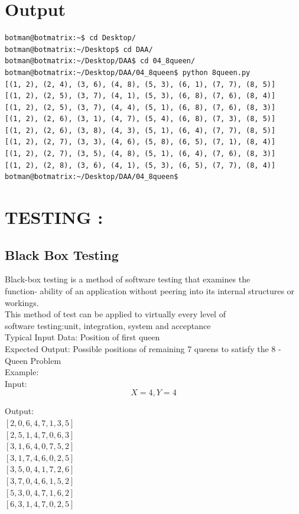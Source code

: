 \documentclass[10pt,a4paper]{article}
\begin{document}
\section{Output}
\begin{lstlisting}
botman@botmatrix:~$ cd Desktop/
botman@botmatrix:~/Desktop$ cd DAA/
botman@botmatrix:~/Desktop/DAA$ cd 04_8queen/
botman@botmatrix:~/Desktop/DAA/04_8queen$ python 8queen.py 
[(1, 2), (2, 4), (3, 6), (4, 8), (5, 3), (6, 1), (7, 7), (8, 5)]
[(1, 2), (2, 5), (3, 7), (4, 1), (5, 3), (6, 8), (7, 6), (8, 4)]
[(1, 2), (2, 5), (3, 7), (4, 4), (5, 1), (6, 8), (7, 6), (8, 3)]
[(1, 2), (2, 6), (3, 1), (4, 7), (5, 4), (6, 8), (7, 3), (8, 5)]
[(1, 2), (2, 6), (3, 8), (4, 3), (5, 1), (6, 4), (7, 7), (8, 5)]
[(1, 2), (2, 7), (3, 3), (4, 6), (5, 8), (6, 5), (7, 1), (8, 4)]
[(1, 2), (2, 7), (3, 5), (4, 8), (5, 1), (6, 4), (7, 6), (8, 3)]
[(1, 2), (2, 8), (3, 6), (4, 1), (5, 3), (6, 5), (7, 7), (8, 4)]
botman@botmatrix:~/Desktop/DAA/04_8queen$ 

\end{lstlisting}

\section{TESTING :}
\subsection{Black Box Testing}
	Black-box testing is a method of software testing that examines the\\ function- ability of an application without peering into its internal structures or workings.\\
	This method of test can be applied to virtually every level of\\ software testing:unit, integration, system and acceptance\\
	Typical Input Data:  Position of first queen\\
	Expected Output: Possible positions of remaining 7 queens to satisfy the 8 - Queen Problem\\
	
	\noindent Example:\\
	Input: \\
	$$X = 4 , Y = 4$$
	
	Output:\\
	$[2, 0, 6, 4, 7, 1, 3, 5]$\\
	$[2, 5, 1, 4, 7, 0, 6, 3]$\\
	$[3, 1, 6, 4, 0, 7, 5, 2]$\\
	$[3, 1, 7, 4, 6, 0, 2, 5]$\\
	$[3, 5, 0, 4, 1, 7, 2, 6]$\\
	$[3, 7, 0, 4, 6, 1, 5, 2]$\\
	$[5, 3, 0, 4, 7, 1, 6, 2]$\\
	$[6, 3, 1, 4, 7, 0, 2, 5]$\\
	
\end{document}
